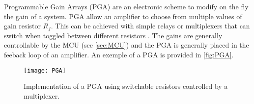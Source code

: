 Programmable Gain Arrays (PGA) are an electronic scheme to modify on the fly the gain of a system. PGA allow an amplifier to choose from multiple values of gain resistor $R_f$.  This can be achieved with simple relays or multiplexers that can switch when toggled between different resistors \cite{Chabowski2015,horowitz1989art}. The gains are generally controllable by the MCU (see \autoref{sec:MCU}) and the PGA is generally placed in the feeback loop of an amplifier. An exemple of a PGA is provided in \autoref{fig:PGA}.
\begin{figure}[h]
    \centering
    \texttt{[image: PGA]}
    \caption{Implementation of a PGA using switchable resistors controlled by a multiplexer.}
    \label{fig:PGA}
\end{figure}